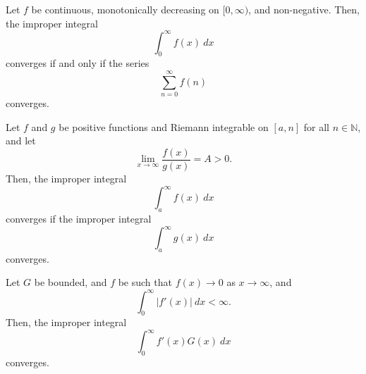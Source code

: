 \documentclass[11pt]{article}
\def\N{\mathbb{N}}
\theoremstyle{definition}
\theoremstyle{remark}
\numberwithin{equation}{module}
\begin{document}
    \begin{theorem}
        Let $f$ be continuous, monotonically decreasing on $[0, \infty)$, and
        non-negative. Then, the improper integral \[
            \int_0^\infty f(x)\:dx
        \] converges if and only if the series \[
            \sum_{n = 0}^\infty f(n)
        \] converges.
    \end{theorem}

    \begin{theorem}
        Let $f$ and $g$ be positive functions and Riemann integrable on $[a, n]$ for
        all $n \in \N$, and let \[
            \lim_{x \to \infty} \frac{f(x)}{g(x)} = A > 0.
        \] Then, the improper integral \[
            \int_a^\infty f(x)\:dx
        \] converges if the improper integral \[
            \int_a^\infty g(x)\:dx
        \] converges.
    \end{theorem}
    
    \begin{theorem}
        Let $G$ be bounded, and $f$ be such that $f(x) \to 0$ as $x \to \infty$, and
        \[
            \int_0^\infty |f'(x)|\:dx < \infty.
        \] Then, the improper integral \[
            \int_0^\infty f'(x)G(x)\:dx
        \] converges.
    \end{theorem}
\end{document}

